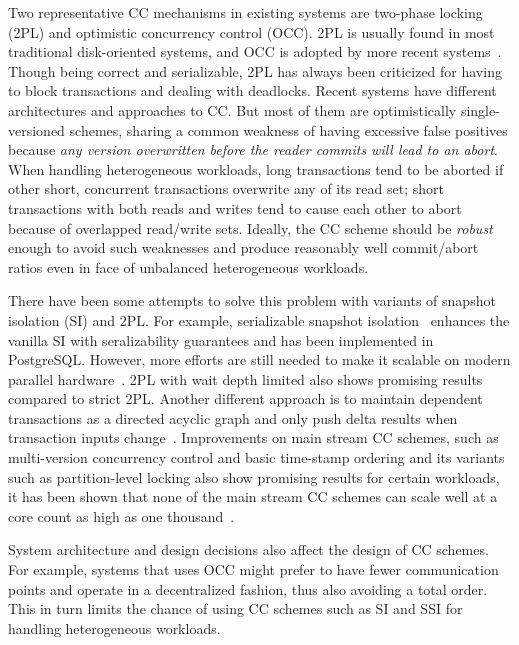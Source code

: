 \documentclass[preprint]{sig-alternate-nocprt}
\begin{document}
Two representative CC mechanisms in existing systems are two-phase locking (2PL) and optimistic concurrency control (OCC). 2PL is usually found in most traditional disk-oriented systems, and OCC is adopted by more recent systems~\cite{Hekaton,Silo}. Though being correct and serializable, 2PL has always been criticized for having to block transactions and dealing with deadlocks. Recent systems have different architectures and approaches to CC. But most of them are optimistically single-versioned schemes, sharing a common weakness of having excessive false positives because \textit{any version overwritten before the reader commits will lead to an abort}. When handling heterogeneous workloads, long transactions tend to be aborted if other short, concurrent transactions overwrite any of its read set; short transactions with both reads and writes tend to cause each other to abort because of overlapped read/write sets. Ideally, the CC scheme should be \textit{robust} enough to avoid such weaknesses and produce reasonably well commit/abort ratios even in face of unbalanced heterogeneous workloads.

There have been some attempts to solve this problem with variants of snapshot isolation (SI) and 2PL. For example, serializable snapshot isolation~\cite{SSI} enhances the vanilla SI with seralizability guarantees and has been implemented in PostgreSQL. However, more efforts are still needed to make it scalable on modern parallel hardware~\cite{ScalableSSI}. 2PL with wait depth limited also shows promising results compared to strict 2PL. Another different approach is to maintain dependent transactions as a directed acyclic graph and only push delta results when transaction inputs change~\cite{LogicBlox}. Improvements on main stream CC schemes, such as multi-version concurrency control and basic time-stamp ordering and its variants such as partition-level locking also show promising results for certain workloads, it has been shown that none of the main stream CC schemes can scale well at a core count as high as one thousand~\cite{CCAbyss}.

System architecture and design decisions also affect the design of CC schemes. For example, systems that uses OCC might prefer to have fewer communication points and operate in a decentralized fashion, thus also avoiding a total order. This in turn limits the chance of using CC schemes such as SI and SSI for handling heterogeneous workloads.
\end{document}
